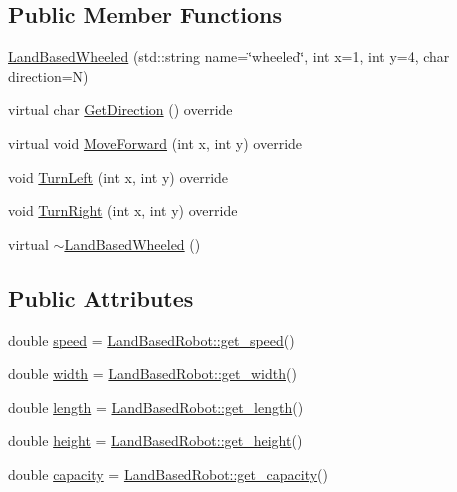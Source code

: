 \subsection*{Public Member Functions}
\begin{DoxyCompactItemize}
\item 
\hyperlink{classfp_1_1_land_based_wheeled_a0fe67f1df86ad377e0ef9d64a64f9416}{Land\+Based\+Wheeled} (std\+::string name=\char`\"{}wheeled\char`\"{}, int x=1, int y=4, char direction=\textquotesingle{}N\textquotesingle{})
\item 
virtual char \hyperlink{classfp_1_1_land_based_wheeled_adaafaceb388374ffb9cec28301665492}{Get\+Direction} () override
\item 
virtual void \hyperlink{classfp_1_1_land_based_wheeled_a9c6a668ce9233468141516c8ea678593}{Move\+Forward} (int x, int y) override
\item 
void \hyperlink{classfp_1_1_land_based_wheeled_ad7e32884e0747b347d5d74db171c2854}{Turn\+Left} (int x, int y) override
\item 
void \hyperlink{classfp_1_1_land_based_wheeled_a759f28e9ca00e77cc0e2f2ce2f524811}{Turn\+Right} (int x, int y) override
\item 
virtual \hyperlink{classfp_1_1_land_based_wheeled_a932593879ef390bf1b019ddb3cfa604d}{$\sim$\+Land\+Based\+Wheeled} ()
\end{DoxyCompactItemize}
\subsection*{Public Attributes}
\begin{DoxyCompactItemize}
\item 
double \hyperlink{classfp_1_1_land_based_wheeled_aaab6e766362d75c7e52a183256123a36}{speed} = \hyperlink{classfp_1_1_land_based_robot_a44fed3a00505f6679ff8505aebae4505}{Land\+Based\+Robot\+::get\+\_\+speed}()
\item 
double \hyperlink{classfp_1_1_land_based_wheeled_af340cd88db06fdbb837eddedf7ec9c14}{width} = \hyperlink{classfp_1_1_land_based_robot_a523b439167030a7ab1e0e7f6c8d42315}{Land\+Based\+Robot\+::get\+\_\+width}()
\item 
double \hyperlink{classfp_1_1_land_based_wheeled_a99e87d729bfd9bee5924a387a11052e6}{length} = \hyperlink{classfp_1_1_land_based_robot_adb03fbded9a3b0553301bcc0322cb1c1}{Land\+Based\+Robot\+::get\+\_\+length}()
\item 
double \hyperlink{classfp_1_1_land_based_wheeled_ae56bdd84440e468928e4f416394d5dde}{height} = \hyperlink{classfp_1_1_land_based_robot_ac77253c989c417ee26654541c50669d4}{Land\+Based\+Robot\+::get\+\_\+height}()
\item 
double \hyperlink{classfp_1_1_land_based_wheeled_a724d9e2b23926f461d8afea8311707e3}{capacity} = \hyperlink{classfp_1_1_land_based_robot_a24c0f6d395f3dfd6bdbcf5a2a9801de1}{Land\+Based\+Robot\+::get\+\_\+capacity}()
\end{DoxyCompactItemize}

